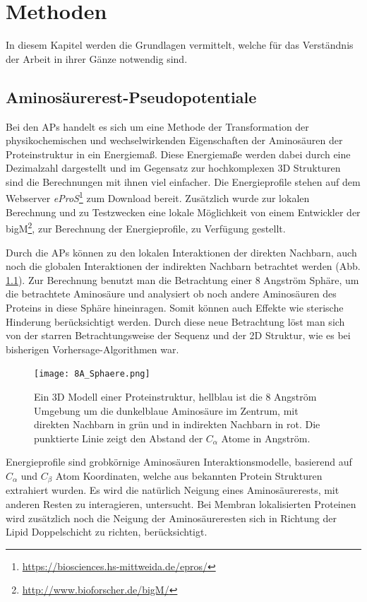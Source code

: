 \chapter{Methoden}

In diesem Kapitel werden die Grundlagen vermittelt, welche für das Verständnis der Arbeit in ihrer Gänze notwendig sind.

\section{Aminosäurerest-Pseudopotentiale}

Bei den \acf{APs} handelt es sich um eine Methode der Transformation der physikochemischen und wechselwirkenden Eigenschaften der Aminosäuren der Proteinstruktur in ein Energiemaß. Diese Energiemaße werden dabei durch eine Dezimalzahl dargestellt und im Gegensatz zur hochkomplexen 3D Strukturen sind die Berechnungen mit ihnen viel einfacher. Die Energieprofile stehen auf dem Webserver \emph{eProS}\footnote{\url{https://biosciences.hs-mittweida.de/epros/}} zum Download bereit. Zusätzlich wurde zur lokalen Berechnung und zu Testzwecken eine lokale Möglichkeit von einem Entwickler der \ac{bigM}\footnote{\url{http://www.bioforscher.de/bigM/}}, zur Berechnung der Energieprofile, zu Verfügung gestellt.

Durch die \ac{APs} können zu den lokalen Interaktionen der direkten Nachbarn, auch noch die globalen Interaktionen der indirekten Nachbarn betrachtet werden (Abb. \ref{fig:8A_Sphaere}). Zur Berechnung benutzt man die Betrachtung einer 8 Angström Sphäre, um die betrachtete Aminosäure und analysiert ob noch andere Aminosäuren des Proteins in diese Sphäre hineinragen. Somit können auch Effekte wie sterische Hinderung berücksichtigt werden. Durch diese neue Betrachtung löst man sich von der starren Betrachtungsweise der Sequenz und der 2D Struktur, wie es bei bisherigen Vorhersage-Algorithmen war.
%
\begin{figure}
\centering
\texttt{[image: 8A\_Sphaere.png]}
\caption{Ein 3D Modell einer Proteinstruktur, hellblau ist die 8 Angström Umgebung um die dunkelblaue Aminosäure im Zentrum, mit direkten Nachbarn in grün und in indirekten Nachbarn in rot. Die punktierte Linie zeigt den Abstand der $C_{\alpha}$ Atome in Angström.}%
\label{fig:8A_Sphaere}
\end{figure}

Energieprofile sind grobkörnige Aminosäuren Interaktionsmodelle, basierend auf $C_{\alpha}$ und $C_{\beta}$ Atom Koordinaten, welche aus bekannten Protein Strukturen extrahiert wurden. Es wird die natürlich Neigung eines Aminosäurerests, mit anderen Resten zu interagieren, untersucht. Bei Membran lokalisierten Proteinen wird zusätzlich noch die Neigung der Aminosäureresten sich in Richtung der Lipid Doppelschicht zu richten, berücksichtigt. 

